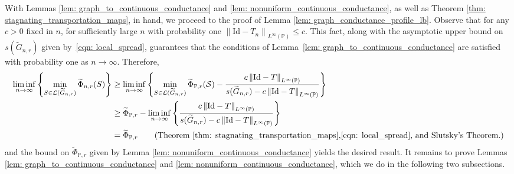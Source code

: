 \documentclass[11pt,twoside]{article}
\newcommand{\set}[1]{\left\{#1\right\}}
\newcommand{\norm}[1]{\left\lVert#1\right\rVert}
\newcommand{\1}{\mathbf{1}}
\newcommand{\Pbb}{\mathbb{P}}
\newcommand{\Sset}{\mathcal{S}}
\begin{document}
With Lemmas \ref{lem: graph_to_continuous_conductance} and \ref{lem: nonuniform_continuous_conductance}, as well as Theorem \ref{thm: stagnating_transportation_maps}, in hand, we proceed to the proof of Lemma \ref{lem: graph_conductance_profile_lb}. Observe that for any $c > 0$ fixed in $n$, for sufficiently large $n$ with probability one $\norm{\mathrm{Id} - T_n}_{L^{\infty}(\Pbb)} \leq c$. This fact, along with the asymptotic upper bound on $s(\widetilde{G}_{n,r})$ given by~\eqref{eqn: local_spread}, guarantees that the conditions of Lemma~\ref{lem: graph_to_continuous_conductance} are satisfied with probability one as $n \to \infty$. Therefore,
\begin{align*}
\liminf_{n \to \infty} \set{\min_{S \in \mathcal{L}(\widetilde{G}_{n,r})} \widetilde{\Phi}_{n,r}(S)} & \geq \liminf_{n \to \infty} \set{\min_{S \in \mathcal{L}(\widetilde{G}_{n,r})} \widetilde{\Phi}_{\Pbb,r}(\Sset) - \frac{c \norm{\mathrm{Id} - T}_{L^{\infty}(\Pbb)} }{s(\widetilde{G}_{n,r}) - c \norm{\mathrm{Id} - T}_{L^{\infty}(\Pbb)}  }} \\
& \geq \widetilde{\Phi}_{\Pbb,r} - \liminf_{n \to \infty} \set{\frac{c \norm{\mathrm{Id} - T}_{L^{\infty}(\Pbb)}}{s(\widetilde{G}_{n,r}) - c \norm{\mathrm{Id} - T}_{L^{\infty}(\Pbb)}}} \\
& = \widetilde{\Phi}_{\Pbb,r} \tag{Theorem \ref{thm: stagnating_transportation_maps},\eqref{eqn: local_spread}, and Slutsky's Theorem.}
\end{align*}
and the bound on $\widetilde{\Phi}_{\Pbb,r}$ given by Lemma \ref{lem: nonuniform_continuous_conductance} yields the desired result. It remains to prove Lemmas \ref{lem: graph_to_continuous_conductance} and \ref{lem: nonuniform_continuous_conductance}, which we do in the following two subsections.
\end{document}

